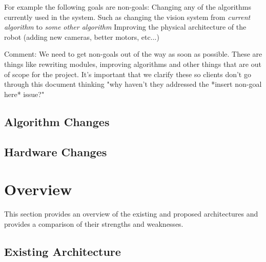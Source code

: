\documentclass[english,12pt]{scrartcl}
\begin{document}
        For example the following goals are non-goals:
        Changing any of the algorithms currently used in the system. Such as changing the vision
        system from \emph{current algorithm} to \emph{some other algorithm} Improving the physical
        architecture of the robot (adding new cameras, better motors, etc...)
        
        Comment: We need to get non-goals out of the way as soon as possible. These are things like
        rewriting modules, improving algorithms and other things that are out of scope for the
        project. It's important that we clarify these so clients don't go through this document
        thinking "why haven't they addressed the *insert non-goal here* issue?"
        
        \subsection{Algorithm Changes}
            
        \subsection{Hardware Changes}
        
    \section{Overview}
        This section provides an overview of the existing and proposed architectures and provides a comparison
        of their strengths and weaknesses.
        
        \subsection{Existing Architecture} 
        
\end{document}

